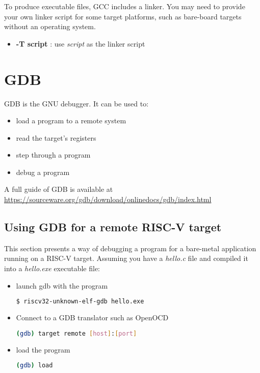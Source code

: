 \documentclass{article}
\begin{document}
    To produce executable files, GCC includes a linker. You may need to provide your own linker script for some target platforms, such as bare-board targets without an operating system.
    
    \vspace{-\topsep}
	\begin{itemize}
	\item \textbf{-T script} : use \textit{script} as the linker script
	\end{itemize}
    
    \newpage
    \section{GDB}
    
    GDB is the GNU debugger. It can be used to:
    
    \vspace{-\topsep}
	\begin{itemize}
	\item load a program to a remote system
	\item read the target's registers
	\item step through a program
	\item debug a program
	\end{itemize}
	
	A full guide of GDB is available at \url{https://sourceware.org/gdb/download/onlinedocs/gdb/index.html}
	
	\subsection{Using GDB for a remote RISC-V target}
	
	This section presents a way of debugging a program for a bare-metal application running on a RISC-V target. Assuming you have a \textit{hello.c} file and compiled it into a \textit{hello.exe} executable file:
	
	\vspace{-\topsep}
	\begin{itemize}
	\item launch gdb with the program
	
	\begin{lstlisting}[language=bash]
    $ riscv32-unknown-elf-gdb hello.exe
    \end{lstlisting}
    
    \item Connect to a GDB translator such as OpenOCD
    
    \begin{lstlisting}[language=bash]
    (gdb) target remote [host]:[port]
    \end{lstlisting}
    
    \item load the program
    
    \begin{lstlisting}[language=bash]
    (gdb) load
    \end{lstlisting}
	\end{itemize}
	
\end{document}
